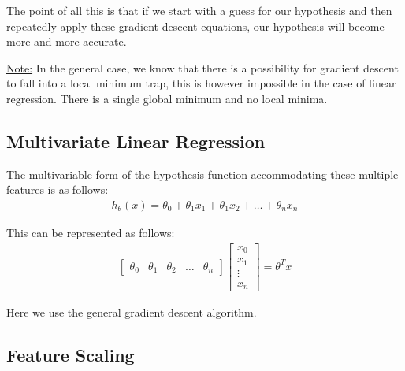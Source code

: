 \documentclass{article}
\begin{document}
        The point of all this is that if we start with a guess for our hypothesis and then repeatedly apply these gradient descent equations, 
        our hypothesis will become more and more accurate.
        \par
        \underline{Note:} In the general case, we know that there is a possibility for gradient descent to fall into a local minimum trap, this is however impossible in the
        case of linear regression. There is a single global minimum and no local minima.

        \newpage 

        \subsection{Multivariate Linear Regression}

        The multivariable form of the hypothesis function accommodating these multiple features is as follows:
        \begin{align*}
            h_{\theta}(x) = \theta_0 + \theta_1x_1 +  \theta_1x_2 + \ldots + \theta_nx_n
        \end{align*}

        This can be represented as follows:
        \begin{align*}
            \begin{bmatrix}
                \theta_0   & \theta_1 & \theta_2 & \dots & \theta_n
            \end{bmatrix}
            \begin{bmatrix}
                x_{0} \\
                x_{1} \\
                \vdots \\
                x_{n} 
            \end{bmatrix}  =  \theta^Tx
        \end{align*}

        Here we use the general gradient descent algorithm.

        \subsection{Feature Scaling}
\end{document}
